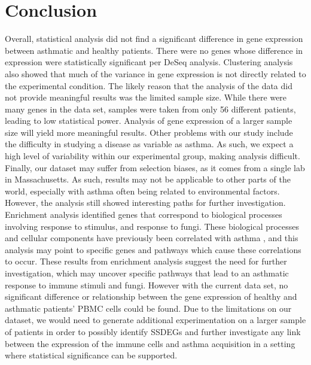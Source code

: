 \documentclass[pdflatex,sn-mathphys]{sn-jnl}%
\theoremstyle{thmstyleone}%
\theoremstyle{thmstyletwo}%
\theoremstyle{thmstylethree}%
\begin{document}
\section{Conclusion}\label{sec4}
Overall, statistical analysis did not find a significant difference in gene expression between asthmatic and healthy patients. There were no genes whose difference in expression were statistically significant per DeSeq analysis. Clustering analysis also showed that much of the variance in gene expression is not directly related to the experimental condition. The likely reason that the analysis of the data did not provide meaningful results was the limited sample size. While there were many genes in the data set, samples were taken from only 56 different patients, leading to low statistical power. Analysis of gene expression of a larger sample size will yield more meaningful results. Other problems with our study include the difficulty in studying a disease as variable as asthma. As such, we expect a high level of variability within our experimental group, making analysis difficult. Finally, our dataset may suffer from selection biases, as it comes from a single lab in Massachusetts. As such, results may not be applicable to other parts of the world, especially with asthma often being related to environmental factors. \\
However, the analysis still showed interesting paths for further investigation. Enrichment analysis identified genes that correspond to biological processes involving response to stimulus, and response to fungi. These biological processes and cellular components have previously been correlated with asthma \cite{Holgate2012-et, Denning2006-jd}, and this analysis may point to specific genes and pathways which cause these correlations to occur. These results from enrichment analysis suggest the need for further investigation, which may uncover specific pathways that lead to an asthmatic response to immune stimuli and fungi. However with the current data set, no significant difference or relationship between the gene expression of healthy and asthmatic patients’ PBMC cells could be found. Due to the limitations on our dataset, we would need to generate additional experimentation on a larger sample of patients in order to possibly identify SSDEGs and further investigate any link between the expression of the immune cells and asthma acquisition in a setting where statistical significance can be supported.
\end{document}
